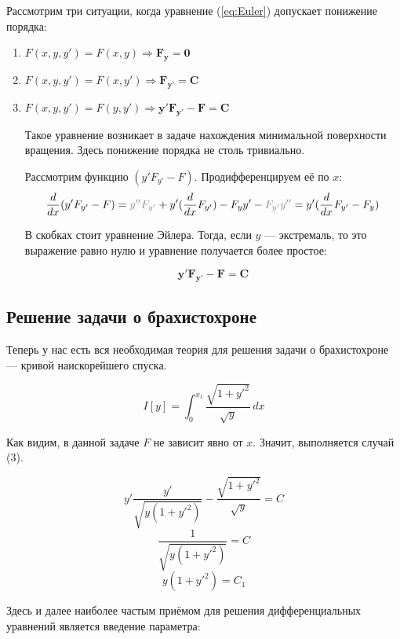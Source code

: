 \documentclass[12pt]{article}
\begin{document}

			Рассмотрим три ситуации, когда уравнение (\ref{eq:Euler}) допускает понижение порядка:

			\begin{enumerate}
				\item $F(x,y,y') = F(x,y)  \Rightarrow \mathbf{F_y = 0}$
				\item $F(x,y,y') = F(x,y') \Rightarrow \mathbf{F_{y'} = C}$
				\item $F(x,y,y') = F(y,y') \Rightarrow \mathbf{y'F_{y'} - F = C}$

					Такое уравнение возникает в задаче нахождения минимальной поверхности вращения. Здесь
					понижение порядка не столь тривиально.

					Рассмотрим функцию $(y'F_{y'} - F)$. Продифференцируем её по $x$:
					$$\frac{d}{dx}(y'F_{y'} - F) =
			  			\off{y''F_{y'}} + y'(\frac{d}{dx}F_{y'}) - F_yy' - \off{F_{y'}y''} = 
			  			y'(\frac{d}{dx}F_{y'} - F_y)$$

					В скобках стоит уравнение Эйлера. Тогда, если $y$ --- экстремаль, то это выражение равно
					нулю и уравнение получается более простое:

					$$\mathbf{y'F_{y'} - F = C}$$
			\end{enumerate}

	\subsection{Решение задачи о брахистохроне}

		Теперь у нас есть вся необходимая теория для решения задачи о брахистохроне --- кривой наискорейшего
		спуска.

		$$I[y] = \int_0^{x_1} \frac{\sqrt{1+y'^2}}{\sqrt{y}} \,dx$$

		Как видим, в данной задаче $F$ не зависит явно от $x$. Значит, выполняется случай (3).

		$$y'\frac{y'}{\sqrt{y(1+y'^2)}} - \frac{\sqrt{1+y'^2}}{\sqrt{y}} = C$$
		$$\frac{1}{\sqrt{y(1+y'^2)}} = C$$
		$$y(1+y'^2) = C_1$$

		Здесь и далее наиболее частым приёмом для решения дифференциальных уравнений является введение параметра:
\end{document}
